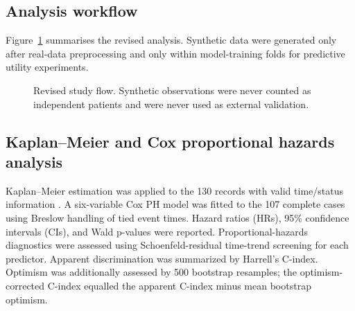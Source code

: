 \documentclass[a4paper,12pt]{article}
\begin{document}
\subsection{Analysis workflow}
Figure~\ref{fig:studyflow} summarises the revised analysis. Synthetic data were generated only after real-data preprocessing and only within model-training folds for predictive utility experiments.

\begin{figure}[H]
\centering
{}
\caption{Revised study flow. Synthetic observations were never counted as independent patients and were never used as external validation.}
\label{fig:studyflow}
\end{figure}

\subsection{Kaplan--Meier and Cox proportional hazards analysis}
Kaplan--Meier estimation was applied to the 130 records with valid time/status information \cite{ref29}. A six-variable Cox PH model \cite{ref30} was fitted to the 107 complete cases using Breslow handling of tied event times. Hazard ratios (HRs), 95\% confidence intervals (CIs), and Wald p-values were reported. Proportional-hazards diagnostics were assessed using Schoenfeld-residual time-trend screening for each predictor. Apparent discrimination was summarized by Harrell's C-index. Optimism was additionally assessed by 500 bootstrap resamples; the optimism-corrected C-index equalled the apparent C-index minus mean bootstrap optimism.
\end{document}
